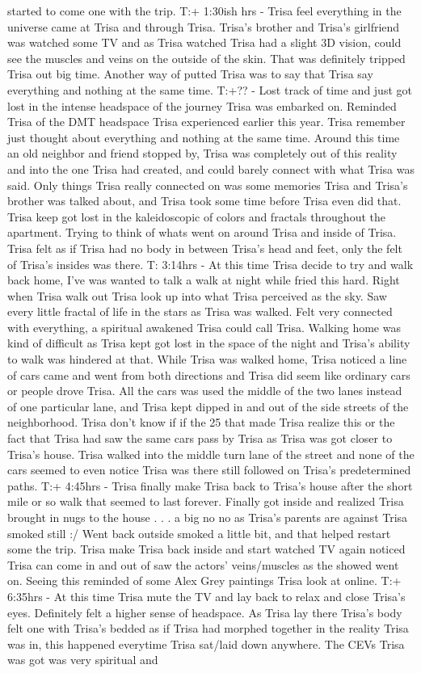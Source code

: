 \documentclass[12pt]{book}
\begin{document}
started to come one with the trip. T:+ 1:30ish hrs - Trisa feel everything in the universe came at Trisa and through Trisa. Trisa's brother and Trisa's girlfriend was watched some TV and as Trisa watched Trisa had a slight 3D vision, could see the muscles and veins on the outside of the skin. That was definitely tripped Trisa out big time. Another way of putted Trisa was to say that Trisa say everything and nothing at the same time. T:+?? - Lost track of time and just got lost in the intense headspace of the journey Trisa was embarked on. Reminded Trisa of the DMT headspace Trisa experienced earlier this year. Trisa remember just thought about everything and nothing at the same time. Around this time an old neighbor and friend stopped by, Trisa was completely out of this reality and into the one Trisa had created, and could barely connect with what Trisa was said. Only things Trisa really connected on was some memories Trisa and Trisa's brother was talked about, and Trisa took some time before Trisa even did that. Trisa keep got lost in the kaleidoscopic of colors and fractals throughout the apartment. Trying to think of whats went on around Trisa and inside of Trisa. Trisa felt as if Trisa had no body in between Trisa's head and feet, only the felt of Trisa's insides was there. T: 3:14hrs - At this time Trisa decide to try and walk back home, I've was wanted to talk a walk at night while fried this hard. Right when Trisa walk out Trisa look up into what Trisa perceived as the sky. Saw every little fractal of life in the stars as Trisa was walked. Felt very connected with everything, a spiritual awakened Trisa could call Trisa. Walking home was kind of difficult as Trisa kept got lost in the space of the night and Trisa's ability to walk was hindered at that. While Trisa was walked home, Trisa noticed a line of cars came and went from both directions and Trisa did seem like ordinary cars or people drove Trisa. All the cars was used the middle of the two lanes instead of one particular lane, and Trisa kept dipped in and out of the side streets of the neighborhood. Trisa don't know if if the 25 that made Trisa realize this or the fact that Trisa had saw the same cars pass by Trisa as Trisa was got closer to Trisa's house. Trisa walked into the middle turn lane of the street and none of the cars seemed to even notice Trisa was there still followed on Trisa's predetermined paths. T:+ 4:45hrs - Trisa finally make Trisa back to Trisa's house after the short mile or so walk that seemed to last forever. Finally got inside and realized Trisa brought in nugs to the house . . .  a big no no as Trisa's parents are against Trisa smoked still :/ Went back outside smoked a little bit, and that helped restart some the trip. Trisa make Trisa back inside and start watched TV again noticed Trisa can come in and out of saw the actors' veins/muscles as the showed went on. Seeing this reminded of some Alex Grey paintings Trisa look at online. T:+ 6:35hrs - At this time Trisa mute the TV and lay back to relax and close Trisa's eyes. Definitely felt a higher sense of headspace. As Trisa lay there Trisa's body felt one with Trisa's bedded as if Trisa had morphed together in the reality Trisa was in, this happened everytime Trisa sat/laid down anywhere. The CEVs Trisa was got was very spiritual and 
\end{document}
